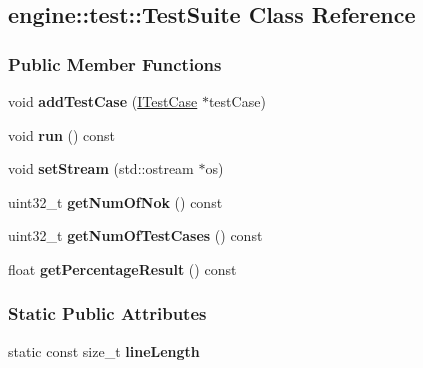 \hypertarget{a00077}{}\subsection{engine\+:\+:test\+:\+:Test\+Suite Class Reference}
\label{a00077}
\subsubsection*{Public Member Functions}
\begin{DoxyCompactItemize}
\item 
void {\bfseries add\+Test\+Case} (\hyperlink{a00054}{I\+Test\+Case} $\ast$test\+Case)\hypertarget{a00077_acd67d04d098732ecbbb004baa47cada3}{}\label{a00077_acd67d04d098732ecbbb004baa47cada3}

\item 
void {\bfseries run} () const \hypertarget{a00077_a960f84ba5a59d617afbf780925badfc9}{}\label{a00077_a960f84ba5a59d617afbf780925badfc9}

\item 
void {\bfseries set\+Stream} (std\+::ostream $\ast$os)\hypertarget{a00077_a015fb4b5ed8291b5bd080747234250a5}{}\label{a00077_a015fb4b5ed8291b5bd080747234250a5}

\item 
uint32\+\_\+t {\bfseries get\+Num\+Of\+Nok} () const \hypertarget{a00077_a3cbb7c01265e80c47aa492b58409e08f}{}\label{a00077_a3cbb7c01265e80c47aa492b58409e08f}

\item 
uint32\+\_\+t {\bfseries get\+Num\+Of\+Test\+Cases} () const \hypertarget{a00077_a84e95ee86987b0b4b0c443ecc487edaf}{}\label{a00077_a84e95ee86987b0b4b0c443ecc487edaf}

\item 
float {\bfseries get\+Percentage\+Result} () const \hypertarget{a00077_a7e01d7ba4edd6f30d641b1315fbbb471}{}\label{a00077_a7e01d7ba4edd6f30d641b1315fbbb471}

\end{DoxyCompactItemize}
\subsubsection*{Static Public Attributes}
\begin{DoxyCompactItemize}
\item 
static const size\+\_\+t {\bfseries line\+Length}\hypertarget{a00077_a968656c029005f67f71efa22edbc7689}{}\label{a00077_a968656c029005f67f71efa22edbc7689}

\end{DoxyCompactItemize}
